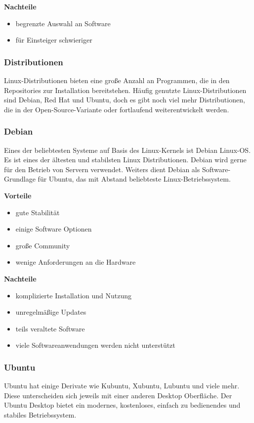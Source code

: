 \textbf{Nachteile}
\begin{itemize}
	\item begrenzte Auswahl an Software
	\item für Einsteiger schwieriger
\end{itemize}

\subsubsection{Distributionen}
Linux-Distributionen bieten eine große Anzahl an Programmen, die in den Repositories zur Installation bereitstehen. Häufig genutzte Linux-Distributionen sind Debian, Red Hat und Ubuntu, doch es gibt noch viel mehr Distributionen, die in der Open-Source-Variante oder fortlaufend weiterentwickelt werden.\textcite{LinuxDistribution}

\subsubsection{Debian}
Eines der beliebtesten Systeme auf Basis des Linux-Kernels ist Debian Linux-OS. Es ist eines der ältesten und stabilsten Linux Distributionen. Debian wird gerne für den Betrieb von Servern verwendet. Weiters dient Debian als Software-Grundlage für Ubuntu, das mit Abstand beliebteste Linux-Betriebssystem. \textcite{DebianLinuxOS}

\textbf{Vorteile}
\begin{itemize}
	\item gute Stabilität
	\item einige Software Optionen
	\item große Community
	\item wenige Anforderungen an die Hardware
\end{itemize}

\textbf{Nachteile}
\begin{itemize}
	\item komplizierte Installation und Nutzung
	\item unregelmäßige Updates
	\item teils veraltete Software
	\item viele Softwareanwendungen werden nicht unterstützt
\end{itemize}


\subsubsection{Ubuntu}
Ubuntu hat einige Derivate wie Kubuntu, Xubuntu, Lubuntu und viele mehr. Diese unterscheiden sich jeweils mit einer anderen Desktop Oberfläche. Der Ubuntu Desktop bietet ein modernes, kostenloses, einfach zu bedienendes und stabiles Betriebssystem. \textcite{UbuntuVsDebian} \textcite{WarumUbuntu}

